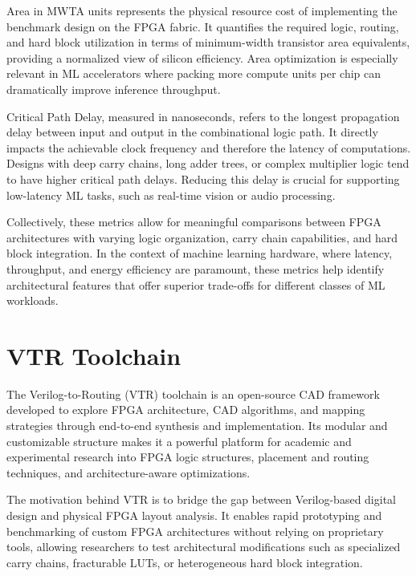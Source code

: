 Area in MWTA units represents the physical resource cost of implementing the benchmark design on the FPGA fabric\cite{arch-benchmark-metrics-1}. It quantifies the required logic, routing, and hard block utilization in terms of minimum-width transistor area equivalents, providing a normalized view of silicon efficiency. Area optimization is especially relevant in ML accelerators where packing more compute units per chip can dramatically improve inference throughput.

Critical Path Delay, measured in nanoseconds, refers to the longest propagation delay between input and output in the combinational logic path\cite{arch-benchmark-metrics-2}. It directly impacts the achievable clock frequency and therefore the latency of computations. Designs with deep carry chains, long adder trees, or complex multiplier logic tend to have higher critical path delays. Reducing this delay is crucial for supporting low-latency ML tasks, such as real-time vision or audio processing.

Collectively, these metrics allow for meaningful comparisons between FPGA architectures with varying logic organization, carry chain capabilities, and hard block integration. In the context of machine learning hardware, where latency, throughput, and energy efficiency are paramount, these metrics help identify architectural features that offer superior trade-offs for different classes of ML workloads.


\section{VTR Toolchain}
The Verilog-to-Routing (VTR) toolchain is an open-source CAD framework developed to explore FPGA architecture, CAD algorithms, and mapping strategies through end-to-end synthesis and implementation. Its modular and customizable structure makes it a powerful platform for academic and experimental research into FPGA logic structures, placement and routing techniques, and architecture-aware optimizations\cite{vtr-toolchain-1}\cite{target-arch-2}.

The motivation behind VTR is to bridge the gap between Verilog-based digital design and physical FPGA layout analysis. It enables rapid prototyping and benchmarking of custom FPGA architectures without relying on proprietary tools, allowing researchers to test architectural modifications such as specialized carry chains, fracturable LUTs, or heterogeneous hard block integration.

